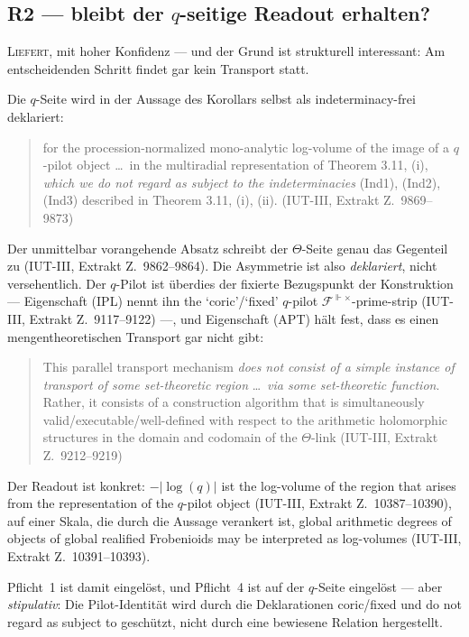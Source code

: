 \documentclass[11pt,a4paper]{article}
\theoremstyle{definition}
\newcommand{\anchor}[2]{(#1, Extrakt Z.~#2)}
\begin{document}
\subsection{R2 --- bleibt der \texorpdfstring{$q$}{q}-seitige Readout erhalten?}

\textsc{Liefert}, mit hoher Konfidenz --- und der Grund ist strukturell
interessant: Am entscheidenden Schritt findet gar kein Transport statt.

Die $q$-Seite wird in der Aussage des Korollars selbst als indeterminacy-frei
deklariert:

\begin{quote}\small
\glqq for the procession-normalized mono-analytic log-volume of the image of a
$q$-pilot object \dots\ in the multiradial representation of Theorem 3.11, (i),
\emph{which we do not regard as subject to the indeterminacies} (Ind1), (Ind2),
(Ind3) described in Theorem 3.11, (i), (ii).\grqq
\hfill\anchor{IUT-III}{9869--9873}
\end{quote}

Der unmittelbar vorangehende Absatz schreibt der $\Theta$-Seite genau das
Gegenteil zu \anchor{IUT-III}{9862--9864}. Die Asymmetrie ist also
\emph{deklariert}, nicht versehentlich. Der $q$-Pilot ist überdies der fixierte
Bezugspunkt der Konstruktion --- Eigenschaft (IPL) nennt ihn \glqq the
`coric'/`fixed' $q$-pilot $\mathcal{F}^{\Vdash\times}$-prime-strip\grqq
\anchor{IUT-III}{9117--9122} ---, und Eigenschaft (APT) hält fest, dass es einen
mengentheoretischen Transport gar nicht gibt:

\begin{quote}\small
\glqq This parallel transport mechanism \emph{does not consist of a simple instance of
transport of some set-theoretic region} \dots\ \emph{via some set-theoretic
function}. Rather, it consists of a construction algorithm that is simultaneously
valid/executable/well-defined with respect to the arithmetic holomorphic
structures in the domain and codomain of the $\Theta$-link\grqq
\hfill\anchor{IUT-III}{9212--9219}
\end{quote}

Der Readout ist konkret: $-|\log(q)|$ ist \glqq the log-volume of the region that
arises from the representation of the $q$-pilot object\grqq
\anchor{IUT-III}{10387--10390}, auf einer Skala, die durch die Aussage verankert
ist, \glqq global arithmetic degrees of objects of global realified Frobenioids may be
interpreted as log-volumes\grqq{} \anchor{IUT-III}{10391--10393}.

Pflicht~1 ist damit eingelöst, und Pflicht~4 ist auf der $q$-Seite eingelöst ---
aber \emph{stipulativ}: Die Pilot-Identität wird durch die Deklarationen
\glqq coric\grqq{}/\glqq fixed\grqq{} und \glqq do not regard as subject to\grqq{} geschützt, nicht durch eine
bewiesene Relation hergestellt.
\end{document}
